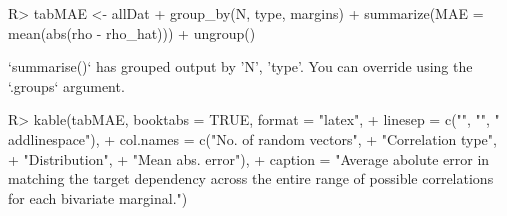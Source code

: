 \documentclass[
]{jss}
\begin{document}
\begin{CodeChunk}
\begin{CodeInput}
R> tabMAE <- allDat %
+     group_by(N, type, margins) %
+     summarize(MAE = mean(abs(rho - rho_hat))) %
+     ungroup()
\end{CodeInput}
\begin{CodeOutput}
`summarise()` has grouped output by 'N', 'type'. You can override using the `.groups` argument.
\end{CodeOutput}
\begin{CodeInput}
R> kable(tabMAE, booktabs = TRUE, format = "latex",
+       linesep = c("", "", "\\addlinespace"),
+       col.names = c("No. of random vectors",
+                     "Correlation type",
+                     "Distribution",
+                     "Mean abs. error"),
+       caption = "Average abolute error in matching the target dependency across the entire range of possible correlations for each bivariate marginal.")
\end{CodeInput}
\begin{table}


\end{table}
\end{CodeChunk}
\end{document}
